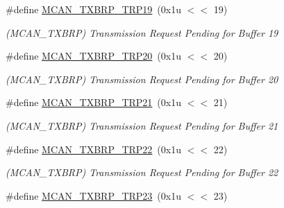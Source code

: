 \begin{DoxyCompactItemize}
\mbox{\label{group__SAME70__MCAN_ga2939a15bbac374110a79e5e675136756}} 
\#define \mbox{\hyperlink{group__SAME70__MCAN_ga2939a15bbac374110a79e5e675136756}{M\+C\+A\+N\+\_\+\+T\+X\+B\+R\+P\+\_\+\+T\+R\+P19}}~(0x1u $<$$<$ 19)
\begin{DoxyCompactList}\small\item\em (M\+C\+A\+N\+\_\+\+T\+X\+B\+RP) Transmission Request Pending for Buffer 19 \end{DoxyCompactList}\item 
\mbox{\label{group__SAME70__MCAN_ga6da4bb40bb3a243edd3ae5a61916f1fc}} 
\#define \mbox{\hyperlink{group__SAME70__MCAN_ga6da4bb40bb3a243edd3ae5a61916f1fc}{M\+C\+A\+N\+\_\+\+T\+X\+B\+R\+P\+\_\+\+T\+R\+P20}}~(0x1u $<$$<$ 20)
\begin{DoxyCompactList}\small\item\em (M\+C\+A\+N\+\_\+\+T\+X\+B\+RP) Transmission Request Pending for Buffer 20 \end{DoxyCompactList}\item 
\mbox{\label{group__SAME70__MCAN_ga7ce1c9535a07fccf9a5345afac59c996}} 
\#define \mbox{\hyperlink{group__SAME70__MCAN_ga7ce1c9535a07fccf9a5345afac59c996}{M\+C\+A\+N\+\_\+\+T\+X\+B\+R\+P\+\_\+\+T\+R\+P21}}~(0x1u $<$$<$ 21)
\begin{DoxyCompactList}\small\item\em (M\+C\+A\+N\+\_\+\+T\+X\+B\+RP) Transmission Request Pending for Buffer 21 \end{DoxyCompactList}\item 
\mbox{\label{group__SAME70__MCAN_ga8ac4a020918c7d38faf93a3a231f87e2}} 
\#define \mbox{\hyperlink{group__SAME70__MCAN_ga8ac4a020918c7d38faf93a3a231f87e2}{M\+C\+A\+N\+\_\+\+T\+X\+B\+R\+P\+\_\+\+T\+R\+P22}}~(0x1u $<$$<$ 22)
\begin{DoxyCompactList}\small\item\em (M\+C\+A\+N\+\_\+\+T\+X\+B\+RP) Transmission Request Pending for Buffer 22 \end{DoxyCompactList}\item 
\mbox{\label{group__SAME70__MCAN_ga80880745617271b51972e18bdeda8661}} 
\#define \mbox{\hyperlink{group__SAME70__MCAN_ga80880745617271b51972e18bdeda8661}{M\+C\+A\+N\+\_\+\+T\+X\+B\+R\+P\+\_\+\+T\+R\+P23}}~(0x1u $<$$<$ 23)
$$
\end{DoxyCompactItemize}
